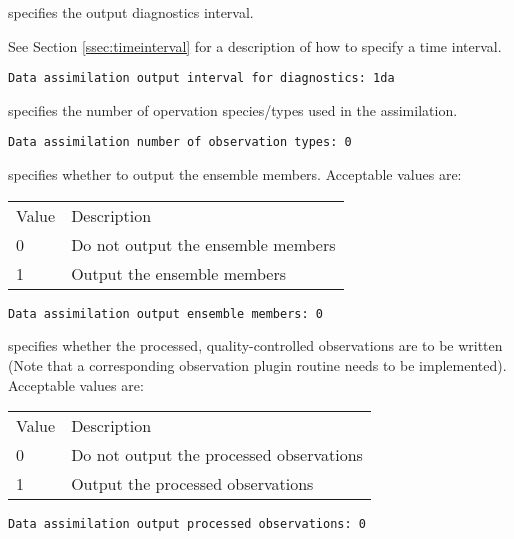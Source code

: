  
  specifies
 the output diagnostics interval.

 See Section \ref{ssec:timeinterval} for a description
 of how to specify a time interval.
 

 \begin{Verbatim}[frame=single]
Data assimilation output interval for diagnostics: 1da
 \end{Verbatim}

 
  specifies the
 number of opervation species/types used in the assimilation.
 

 \begin{Verbatim}[frame=single]
Data assimilation number of observation types: 0
 \end{Verbatim}

 
  specifies whether
 to output the ensemble members.
 Acceptable values are:

 \begin{tabular}{ll}
 Value & Description                         \\
 0     &  Do not output the ensemble members \\
 1     &  Output the ensemble members        \\
 \end{tabular}
 

 \begin{Verbatim}[frame=single]
Data assimilation output ensemble members: 0
 \end{Verbatim}

 
  specifies
 whether the processed, quality-controlled
 observations are to be written (Note that a corresponding observation
 plugin routine needs to be implemented).
 Acceptable values are:

 \begin{tabular}{ll}
 Value & Description                               \\
 0     &  Do not output the processed observations \\
 1     &  Output the processed observations        \\
 \end{tabular}
 

 \begin{Verbatim}[frame=single]
Data assimilation output processed observations: 0
 \end{Verbatim}

